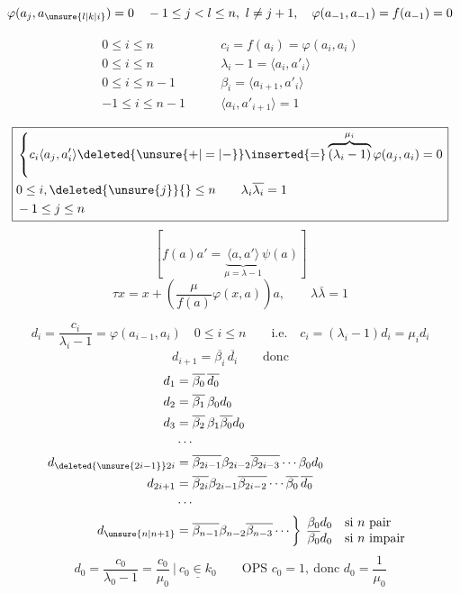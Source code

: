 
\[
\varphi(a_j,a_{\unsure{l|k|i}})=0\quad -1\leq j<l\leq n,\ l\ne j+1,\quad
\varphi(a_{-1},a_{-1})=f(a_{-1})=0
\]

\[
\begin{aligned}
0\leq i\leq n\qquad &c_i=f(a_i)=\varphi(a_i,a_i)\\
0\leq i\leq n\qquad &\lambda_i-1=\langle a_i,a'_i\rangle\\
0\leq i\leq n-1\qquad &\beta_i=\langle a_{i+1},a'_i\rangle\\
-1\leq i\leq n-1\qquad &\langle a_i,a'_{i+1}\rangle=1
\end{aligned}
\]

\[
\boxed{\begin{aligned}
&\left\{c_i\langle a_j,a'_i\rangle\deleted{\unsure{+|=|-}}\inserted{=}\overbrace{(\lambda_i-1)}^{\mu_i}\varphi(a_j,a_i)=0\right.\\
&0\leq i,\deleted{\unsure{j}}{}\leq n\qquad\lambda_i\overline{\lambda_i}=1\\
&-1\leq j\leq n
\end{aligned}}
\]
\[
\left[f(a)a'=\underbrace{\langle a,a'\rangle}_{\mu=\lambda-1}\psi(a)\right]
\]
\[
\tau x=x+\left(\frac{\mu}{f(a)}\varphi(x,a)\right)a,\qquad \lambda\bar\lambda=1
\]

\[
d_i=\frac{c_i}{\lambda_i-1}=\varphi(a_{i-1},a_i)\quad
0\leq i\leq n\qquad\text{i.e.}\quad c_i=(\lambda_i-1)d_i=\mu_i d_i
\]
\[
d_{i+1}=\overline{\beta_i}\,\overline{d_i}\qquad\text{donc}
\]
\[
\begin{aligned}
d_1&=\overline{\beta_0}\,\overline{d_0}\\
d_2&=\overline{\beta_1}\,\beta_0 d_0\\
d_3&=\overline{\beta_2}\,\beta_1\overline{\beta_0}d_0\\
&\cdots\\
d_{\deleted{\unsure{2i-1}}2i}&=\overline{\beta_{2i-1}}\beta_{2i-2}\overline{\beta_{2i-3}}\cdots\beta_0d_0\\
d_{2i+1}&=\overline{\beta_{2i}}\beta_{2i-1}\overline{\beta_{2i-2}}\cdots\overline{\beta_0}\,\overline{d_0}\\
&\cdots\\
d_{\unsure{n|n+1}}&=\overline{\beta_{n-1}}\beta_{n-2}\overline{\beta_{n-3}}\cdots
\left\}\begin{array}{ll}\beta_0d_0&\text{si }n\text{ pair}\\\overline{\beta_0}d_0&\text{si }n\text{ impair}\end{array}\right.
\end{aligned}
\]
\[
d_0=\frac{c_0}{\lambda_0-1}=\frac{c_0}{\mu_0}\ \Big|\ \underline{c_0\in k_0}
\qquad \text{OPS }c_0=1,\ \text{donc }d_0=\frac{1}{\mu_0}
\]

